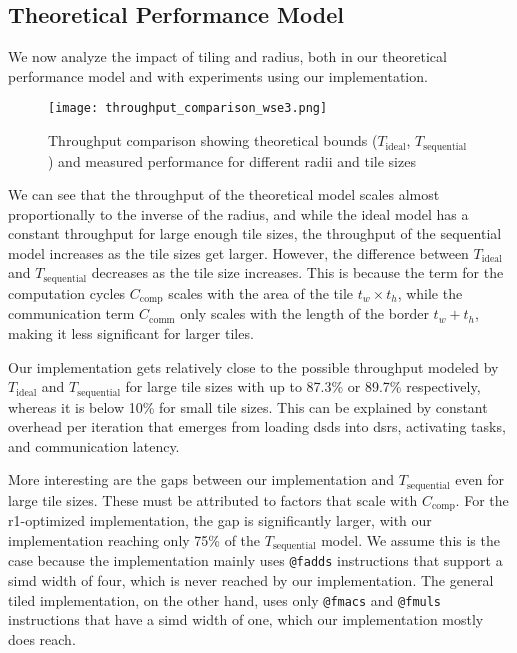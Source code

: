 \subsection{Theoretical Performance Model}
\label{sec:perf_model_validation}
We now analyze the impact of tiling and radius, both in our theoretical performance model and with experiments using our implementation.
\begin{figure}[h]
    \centering
    \texttt{[image: throughput\_comparison\_wse3.png]}
    \caption{Throughput comparison showing theoretical bounds ($T_{\mathrm{ideal}}$, $T_{\mathrm{sequential}}$) and measured performance for different radii and tile sizes}
    \label{fig:throughput_comparison_wse3}
\end{figure}
We can see that the throughput of the theoretical model scales almost proportionally to the inverse of the radius, and while the ideal model has a constant throughput for large enough tile sizes, the throughput of the sequential model increases as the tile sizes get larger.
However, the difference between $T_{\mathrm{ideal}}$ and $T_{\mathrm{sequential}}$ decreases as the tile size increases. This is because the term for the computation cycles $C_{\mathrm{comp}}$ scales with the area of the tile $t_w \times t_h$, while the communication term $C_{\mathrm{comm}}$ only scales with the length of the border $t_w+t_h$, making it less significant for larger tiles.

Our implementation gets relatively close to the possible throughput modeled by $T_{\mathrm{ideal}}$ and $T_{\mathrm{sequential}}$ for large tile sizes with up to 87.3\% or 89.7\% respectively, whereas it is below 10\% for small tile sizes. This can be explained by constant overhead per iteration that emerges from loading \acp{dsd} into \acp{dsr}, activating tasks, and communication latency.

More interesting are the gaps between our implementation and $T_{\mathrm{sequential}}$ even for large tile sizes. These must be attributed to factors that scale with $C_{\mathrm{comp}}$. For the r1-optimized implementation, the gap is significantly larger, with our implementation reaching only 75\% of the $T_{\mathrm{sequential}}$ model. We assume this is the case because the implementation mainly uses \texttt{@fadds} instructions that support a \ac{simd} width of four, which is never reached by our implementation. The general tiled implementation, on the other hand, uses only \texttt{@fmacs} and \texttt{@fmuls} instructions that have a \ac{simd} width of one, which our implementation mostly does reach.

